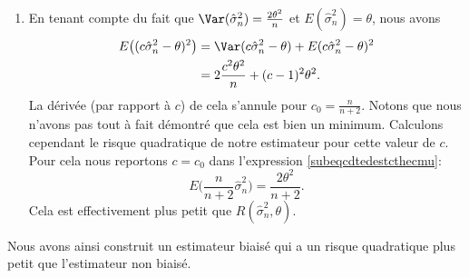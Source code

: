 \begin{example}
\begin{enumerate}
		\item
		      En tenant compte du fait que \( \Var(\hat\sigma_n^2)=\frac{ 2\theta^2 }{ n }\) et \( E(\hat\sigma_n^2)=\theta\), nous avons
		      \begin{subequations}
			      \begin{align}
				      E\big( (c\hat\sigma_n^2-\theta)^2 \big) & =\Var(c\hat\sigma_n^2-\theta)+E(c\hat\sigma_n^2-\theta)^2                   \\
				                                              & =2\frac{ c^2\theta^2 }{ n }+(c-1)^2\theta^2.   \label{subeqcdtedestcthecmu}
			      \end{align}
		      \end{subequations}
		      La dérivée (par rapport à \( c\)) de cela s'annule pour \( c_0=\frac{ n }{ n+2 }\). Notons que nous n'avons pas tout à fait démontré que cela est bien un minimum. Calculons cependant le risque quadratique de notre estimateur pour cette valeur de \( c\). Pour cela nous reportons \( c=c_0\) dans l'expression \eqref{subeqcdtedestcthecmu}:
		      \begin{equation}
			      E\big( \frac{ n }{ n+2 }\hat\sigma_n^2 \big)=\frac{ 2\theta^2 }{ n+2 }.
		      \end{equation}
		      Cela est effectivement plus petit que \( R(\hat\sigma_n^2,\theta)\).
	\end{enumerate}
	Nous avons ainsi construit un estimateur biaisé qui a un risque quadratique plus petit que l'estimateur non biaisé.
\end{example}

